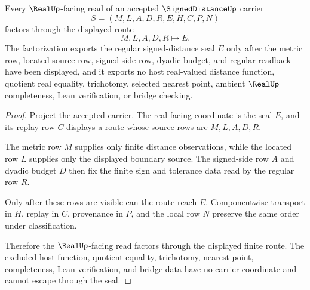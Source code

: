 \begin{theorem}
\label{thm:signed-distance-real-seal-nonescape}
Every $\RealUp$-facing read of an accepted $\SignedDistanceUp$ carrier
$$
S=(M,L,A,D,R,E,H,C,P,N)
$$
factors through the displayed route
$$
M,L,A,D,R \longmapsto E .
$$
The factorization exports the regular signed-distance seal $E$ only after the metric row, located-source row, signed-side row, dyadic budget, and regular readback have been displayed, and it exports no host real-valued distance function, quotient real equality, trichotomy, selected nearest point, ambient $\RealUp$ completeness, Lean verification, or bridge checking.
\end{theorem}
\begin{proof}
Project the accepted carrier. The real-facing coordinate is the seal $E$, and its replay row $C$ displays a route whose source rows are $M,L,A,D,R$.

The metric row $M$ supplies only finite distance observations, while the located row $L$ supplies only the displayed boundary source. The signed-side row $A$ and dyadic budget $D$ then fix the finite sign and tolerance data read by the regular row $R$.

Only after these rows are visible can the route reach $E$. Componentwise transport in $H$, replay in $C$, provenance in $P$, and the local row $N$ preserve the same order under classification.

Therefore the $\RealUp$-facing read factors through the displayed finite route. The excluded host function, quotient equality, trichotomy, nearest-point, completeness, Lean-verification, and bridge data have no carrier coordinate and cannot escape through the seal.
\end{proof}


\begin{closurestatus}{\SignedDistanceUp}
  \theoryclosure{\seedClosure}
  \formalstatus{\unformalizedV}
\end{closurestatus}
